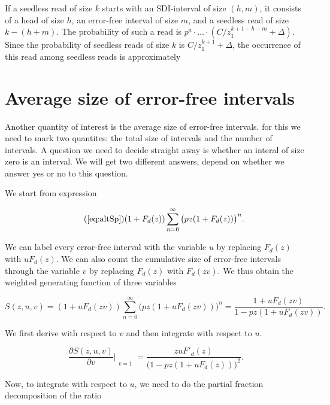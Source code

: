 \documentclass{article}
\begin{document}
If a seedless read of size $k$ starts with an SDI-interval of size
$(h,m)$, it consists of a head of size $h$, an error-free interval of size
$m$, and a seedless read of size $k-(h+m)$. The probability of such a read
is $p^a \cdot \ldots \cdot (C/z_1^{k+1-h-m} + \Delta)$. Since the
probability of seedless reads of size $k$ is $C/z_1^{k+1} + \Delta$, the
occurrence of this read among seedless reads is approximately







\section{Average size of error-free intervals}
\label{sec:avsz}

Another quantity of interest is the average size of error-free intervals.
for this we need to mark two quantites: the total size of intervals and
the number of intervals. A question we need to decide straight away is
whether an interal of size zero is an interval. We will get two different
answers, depend on whether we answer yes or no to this question.

We start from expression

\begin{equation}
\tag{\ref{eq:altSp}}
(1+F_d(z)) \sum_{n=0}^\infty \big( pz(1+F_d(z)) \big)^n.
\end{equation}

We can label every error-free interval with the variable $u$ by replacing
$F_d(z)$ with $uF_d(z)$. We can also count the cumulative size of
error-free intervals through the variable $v$ by replacing $F_d(z)$ with
$F_d(zv)$. We thus obtain the weighted generating function of three
variables

\begin{equation*}
S(z,u,v) = (1+uF_d(zv)) \sum_{n=0}^\infty \big( pz(1+uF_d(zv)) \big)^n =
\frac{1+uF_d(zv)}{1-pz(1+uF_d(zv))}.
\end{equation*}

We first derive with respect to $v$ and then integrate with
respect to $u$.

\begin{equation*}
\frac{\partial S(z,u,v)}{\partial v} \Bigr|_{\substack{\\v=1}} =
 \frac{zuF'_d(z)} {\big( 1-pz(1+uF_d(z)) \big)^2}.
\end{equation*}

Now, to integrate with respect to $u$, we need to do the partial fraction
decomposition of the ratio

%
%

\end{document}
